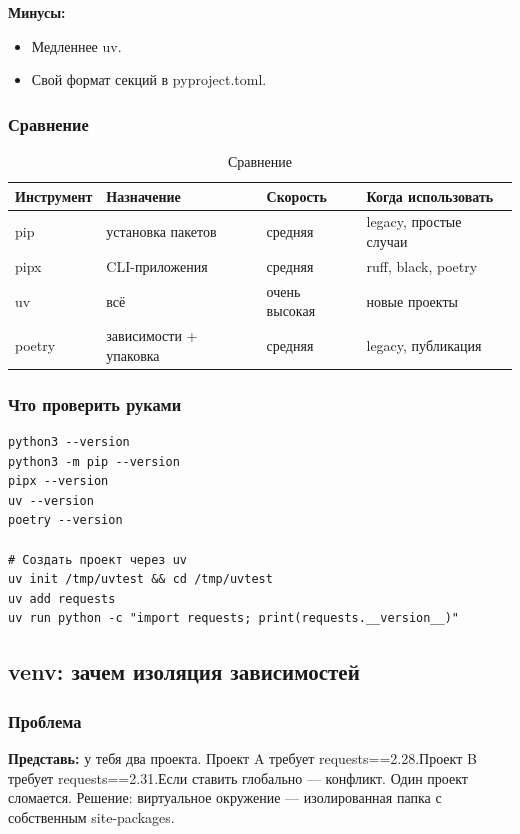 \textbf{Минусы:}
\begin{itemize}
\item Медленнее uv.
\item Свой формат секций в pyproject.toml.
\end{itemize}

\subsubsection{Сравнение}
\begin{table}[h]
\centering
\begin{tabular}{|l|l|l|l|}
\hline
Инструмент & Назначение & Скорость & Когда использовать \\
\hline
pip & установка пакетов & средняя & legacy, простые случаи\\
pipx & CLI-приложения & средняя & ruff, black, poetry\\
uv & всё & очень высокая & новые проекты\\
poetry & зависимости + упаковка & средняя & legacy, публикация\\
\hline
\end{tabular}
\caption{Сравнение}
\end{table}


\subsubsection{Что проверить руками}
\begin{lstlisting}
python3 --version
python3 -m pip --version
pipx --version
uv --version
poetry --version

# Создать проект через uv
uv init /tmp/uvtest && cd /tmp/uvtest
uv add requests
uv run python -c "import requests; print(requests.__version__)"
\end{lstlisting}

\subsection{venv: зачем изоляция зависимостей}
\subsubsection{ Проблема}

\textbf{Представь:} у тебя два проекта. Проект A требует requests==2.28.Проект B требует requests==2.31.Если ставить глобально — конфликт. Один проект сломается.
Решение: виртуальное окружение — изолированная папка с собственным site-packages.

